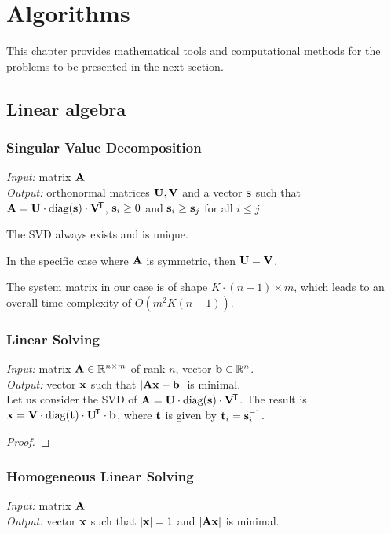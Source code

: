\chapter{Algorithms}

This chapter provides mathematical tools and computational methods for the problems to be presented in the next section.

\section{Linear algebra}

\subsection{Singular Value Decomposition}
\textit{Input:} matrix $\mathbf{A}$\\
\textit{Output:} orthonormal matrices $\mathbf{U}, \mathbf{V}$ and a vector $\mathbf{s}$ such that $\mathbf{A} = \mathbf{U} \cdot \textrm{diag}(\mathbf{s}) \cdot \mathbf{V}^{\!\mathsf{T}}$, $\mathbf{s}_i \geq 0$ and $\mathbf{s}_i \geq \mathbf{s}_j$ for all $i \leq j$.\\


The SVD always exists and is unique.

In the specific case where $\mathbf{A}$ is symmetric, then $\mathbf{U} = \mathbf{V}$.

The system matrix in our case is of shape $K \cdot (n - 1) \times m$, which leads to an overall time complexity of $O(m^2 K (n - 1))$.

\subsection{Linear Solving}
\textit{Input:} matrix $\mathbf{A} \in \mathbb{R}^{n \times m}$ of rank $n$, vector $\mathbf{b} \in \mathbb{R}^n$.\\
\textit{Output:} vector $\mathbf{x}$ such that $|\mathbf{A} \mathbf{x} - \mathbf{b}|$ is minimal.\\

Let us consider the SVD of $\mathbf{A} = \mathbf{U} \cdot \textrm{diag}(\mathbf{s}) \cdot \mathbf{V}^{\!\mathsf{T}}$.
The result is $\mathbf{x} = \mathbf{V} \cdot \textrm{diag}(\mathbf{t}) \cdot \mathbf{U}^{\!\mathsf{T}} \cdot \mathbf{b}$, where $\mathbf{t}$ is given by $\mathbf{t}_i = \mathbf{s}_i ^{-1}$.

\begin{proof}
\todo{\dots}
\end{proof}

\subsection{Homogeneous Linear Solving}
\textit{Input:} matrix $\mathbf{A}$\\
\textit{Output:} vector $\mathbf{x}$ such that $|\mathbf{x}| = 1$ and $|\mathbf{A} \mathbf{x}|$ is minimal.\\

